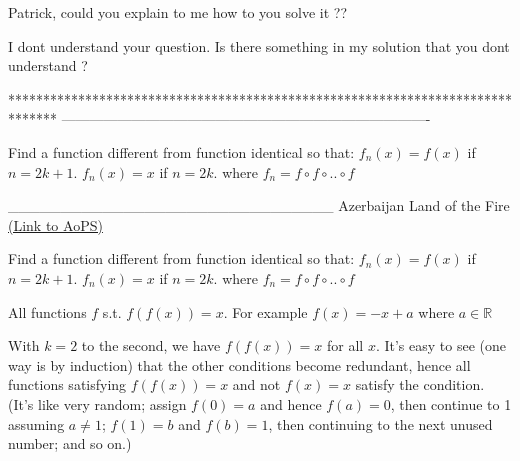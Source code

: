 \begin{solution}
	\begin{tcolorbox}Patrick, could you explain to me how to you solve it ??\end{tcolorbox}
I dont understand your question. Is there something in my solution that you dont understand ?
\end{solution}
*******************************************************************************
-------------------------------------------------------------------------------

\begin{problem}
	Find a function different from function identical so that:
$f_n(x)=f(x)$ if  $ n=2k+1$. $f_n(x)=x$ if  $ n=2k.$ where $f_n=f{\circ}f{\circ}..{\circ}f$


_______________________________
Azerbaijan Land of the Fire 
	\flushright \href{https://artofproblemsolving.com/community/c6h478024}{(Link to AoPS)}
\end{problem}



\begin{solution}
	\begin{tcolorbox}Find a function different from function identical so that:
$f_n(x)=f(x)$ if  $ n=2k+1$. $f_n(x)=x$ if  $ n=2k.$ where $f_n=f{\circ}f{\circ}..{\circ}f$
\end{tcolorbox}

All functions $f$ s.t. $f(f(x))=x$.
For example $f(x)=-x+a$ where $a\in \mathbb{R}$
\end{solution}



\begin{solution}
	With $k = 2$ to the second, we have $f(f(x)) = x$ for all $x$. It's easy to see (one way is by induction) that the other conditions become redundant, hence all functions satisfying $f(f(x)) = x$ and not $f(x) = x$ satisfy the condition. (It's like very random; assign $f(0) = a$ and hence $f(a) = 0$, then continue to 1 assuming $a \neq 1$; $f(1) = b$ and $f(b) = 1$, then continuing to the next unused number; and so on.)
\end{solution}



